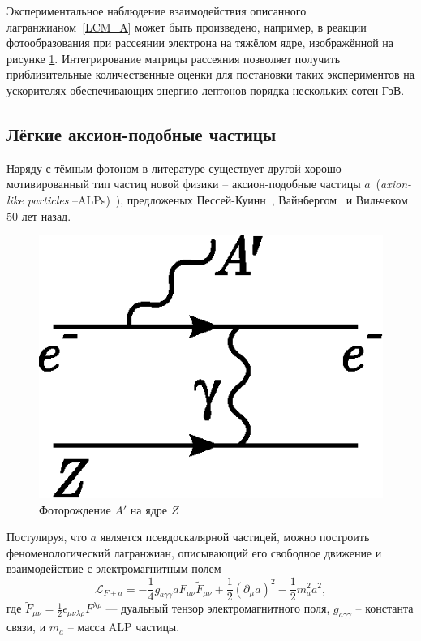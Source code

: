 Экспериментальное наблюдение взаимодействия описанного
лагранжианом~\eqref{LCM_A} может быть произведено, например,
в реакции фотообразования при рассеянии
электрона на тяжёлом ядре, изображённой на рисунке \ref{fig:aprime-production}.
Интегрирование матрицы рассеяния позволяет получить приблизительные
количественные оценки для постановки таких экспериментов на
ускорителях обеспечивающих энергию лептонов порядка
нескольких сотен ГэВ.

\subsection{Лёгкие аксион-подобные частицы}

Наряду с тёмным фотоном в литературе существует другой хорошо мотивированный 
тип частиц новой физики --
аксион-подобные частицы $a$~(\emph{axion-like particles} --ALPs)~\cite{Dobrich2016}), 
предложеных Пессей-Куинн~\cite{Peccei:1977hh}, Вайнбергом~\cite{Weinberg:1977ma} 
и Вильчеком~\cite{Wilczek:1977pj} 50 лет назад. 

\begin{figure}
    \centering
    \includegraphics[width=.55\linewidth]{images/illustrative/aprime-photoprod.eps}
    \caption{Фоторождение $A'$ на ядре $Z$}
    \label{fig:aprime-production}
\end{figure}

Постулируя, что $a$ является псевдоскалярной частицей, можно построить 
феноменологический лагранжиан, описывающий его свободное движение и взаимодействие 
с электромагнитным полем 
\begin{equation}
    \mathcal{L}_{F+a} = - \frac{1}{4} g_{a \gamma \gamma} a F_{\mu \nu} \tilde F_{\mu \nu}
        + \frac{1}{2} (\partial_{\mu} a)^2 - \frac{1}{2} m^2_a a^2,
\end{equation}
где $\tilde{F}_{\mu \nu} = \frac{1}{2} \epsilon_{\mu \nu \lambda \rho} F^{\lambda \rho}$ --- дуальный тензор электромагнитного поля,
$g_{a \gamma \gamma}$ -- константа связи, и $m_a$ -- масса ALP частицы.

